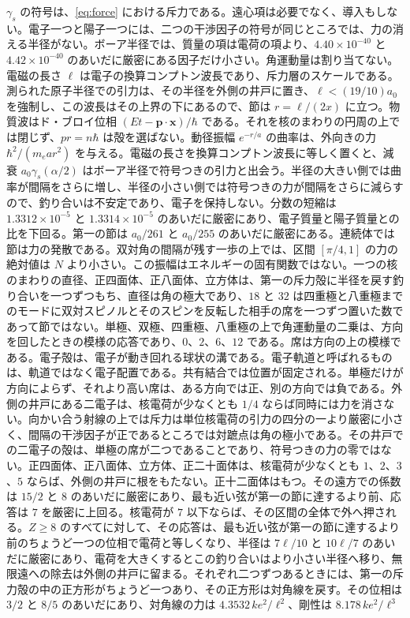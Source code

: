\documentclass[a4paper]{article}
\begin{document}
\(\gamma_s\) の符号は、\eqref{eq:force} における斥力である。遠心項は必要でなく、導入もしない。電子一つと陽子一つには、二つの干渉因子の符号が同じところでは、力の消える半径がない。ボーア半径では、質量の項は電荷の項より、\(4.40\times 10^{-40}\) と \(4.42\times 10^{-40}\) のあいだに厳密にある因子だけ小さい。角運動量は割り当てない。電磁の長さ \(\ell\) は電子の換算コンプトン波長であり、斥力層のスケールである。測られた原子半径での引力は、その半径を外側の井戸に置き、\(\ell<(19/10)a_0\) を強制し、この波長はその上界の下にあるので、節は \(r=\ell/(2x)\) に立つ。物質波はド・ブロイ位相 \((Et-\mathbf{p}\cdot\mathbf{x})/\hbar\) である。それを核のまわりの円周の上では閉じず、\(pr=n\hbar\) は殻を選ばない。動径振幅 \(e^{-r/a}\) の曲率は、外向きの力 \(\hbar^{2}/(m_e a r^{2})\) を与える。電磁の長さを換算コンプトン波長に等しく置くと、減衰 \(a_0\gamma_s(\alpha/2)\) はボーア半径で符号つきの引力と出会う。半径の大きい側では曲率が間隔をさらに増し、半径の小さい側では符号つきの力が間隔をさらに減らすので、釣り合いは不安定であり、電子を保持しない。分数の短縮は \(1.3312\times 10^{-5}\) と \(1.3314\times 10^{-5}\) のあいだに厳密にあり、電子質量と陽子質量との比を下回る。第一の節は \(a_0/261\) と \(a_0/255\) のあいだに厳密にある。連続体では節は力の発散である。双対角の間隔が残す一歩の上では、区間 \([\pi/4,1]\) の力の絶対値は \(N\) より小さい。この振幅はエネルギーの固有関数ではない。一つの核のまわりの直径、正四面体、正八面体、立方体は、第一の斥力殻に半径を戻す釣り合いを一つずつもち、直径は角の極大であり、\(18\) と \(32\) は四重極と八重極までのモードに双対スピノルとそのスピンを反転した相手の席を一つずつ置いた数であって節ではない。単極、双極、四重極、八重極の上で角運動量の二乗は、方向を回したときの模様の応答であり、\(0\)、\(2\)、\(6\)、\(12\) である。席は方向の上の模様である。電子殻は、電子が動き回れる球状の溝である。電子軌道と呼ばれるものは、軌道ではなく電子配置である。共有結合では位置が固定される。単極だけが方向によらず、それより高い席は、ある方向では正、別の方向では負である。外側の井戸にある二電子は、核電荷が少なくとも \(1/4\) ならば同時には力を消さない。向かい合う射線の上では斥力は単位核電荷の引力の四分の一より厳密に小さく、間隔の干渉因子が正であるところでは対蹠点は角の極小である。その井戸での二電子の殻は、単極の席が二つであることであり、符号つきの力の零ではない。正四面体、正八面体、立方体、正二十面体は、核電荷が少なくとも \(1\)、\(2\)、\(3\)、\(5\) ならば、外側の井戸に根をもたない。正十二面体はもつ。その遠方での係数は \(15/2\) と \(8\) のあいだに厳密にあり、最も近い弦が第一の節に達するより前、応答は \(7\) を厳密に上回る。核電荷が \(7\) 以下ならば、その区間の全体で外へ押される。\(Z\ge 8\) のすべてに対して、その応答は、最も近い弦が第一の節に達するより前のちょうど一つの位相で電荷と等しくなり、半径は \(7\ell/10\) と \(10\ell/7\) のあいだに厳密にあり、電荷を大きくするとこの釣り合いはより小さい半径へ移り、無限遠への除去は外側の井戸に留まる。それぞれ二つずつあるときには、第一の斥力殻の中の正方形がちょうど一つあり、その正方形は対角線を戻す。その位相は \(3/2\) と \(8/5\) のあいだにあり、対角線の力は \(4.3532\,k e^{2}/\ell^{2}\)、剛性は \(8.178\,k e^{2}/\ell^{3}\) 
\end{document}
